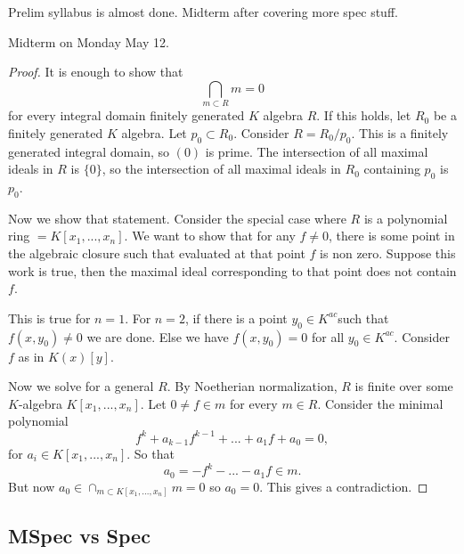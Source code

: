 \section{}
Prelim syllabus is almost done. Midterm after covering more spec stuff.

Midterm on Monday May 12. 


\begin{proof}

    It is enough to show that\[
    \bigcap_{m\subset R} m = 0
    \]
    for every integral domain finitely generated $K$ algebra $R$. If this holds, let $R_0$ be a finitely generated $K$ algebra. Let $p_0\subset R_0$. Consider $R=R_0/p_0$. This is a finitely generated integral domain, so $(0)$ is prime. The intersection of all maximal ideals in $R$ is $\{0\}$, so the intersection of all maximal ideals in $R_0$ containing $p_0$ is $p_0$.



    Now we show that statement. Consider the special case where $R$ is a polynomial ring $=K[x_1,...,x_n]$. We want to show that for any $f\neq 0$, there is some point in the algebraic closure such that evaluated at that point $f$ is non zero. Suppose this work is true, then the maximal ideal corresponding to that point does not contain $f$. 
    
    This is true for $n=1$. For $n=2$, if there is a point $y_0\in K^{ac}$such that $f(x,y_0)\neq 0 $ we are done. Else we have $f(x,y_0)=0$ for all $y_0\in K^{ac}$. Consider $f$ as in $K(x)[y]$.


    Now we solve for a general $R$. By Noetherian normalization, $R$ is finite over some $K$-algebra $K[x_1,...,x_n]$. Let $0\neq f\in m$ for every $m\in R$. Consider the minimal polynomial \[
    f^k +a_{k-1}f^{k-1}+...+a_1f + a_0=0,
    \]
    for $a_i\in K[x_1,...,x_n]$. So that \[
    a_0 = -f^k - ... - a_1f \in m.
    \]
    But now $a_0 \in \cap_{m\subset K[x_1,...,x_n]} m =0$ so $a_0=0$. This gives a contradiction.
\end{proof}

\subsection*{MSpec vs Spec}

